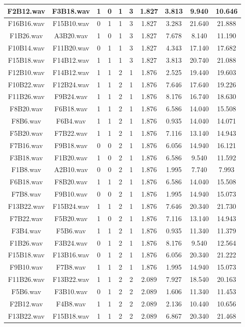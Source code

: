 \documentclass[11pt,a4paper]{book}
\begin{document}
\begin{longtable}[c]{|c|c|c|c|c|c|c|c|c|c|}
F2B12.wav&F3B18.wav&1&0&1&3&1.827&3.813&9.940&10.646\\ \hline
F16B16.wav&F15B10.wav&0&1&1&3&1.827&3.283&21.640&21.888\\ \hline
F1B26.wav&A3B20.wav&1&0&1&3&1.827&7.678&8.140&11.190\\ \hline
F10B14.wav&F11B20.wav&0&1&1&3&1.827&4.343&17.140&17.682\\ \hline
F15B18.wav&F14B12.wav&1&1&1&3&1.827&3.813&20.740&21.088\\ \hline
F12B10.wav&F14B12.wav&1&1&2&1&1.876&2.525&19.440&19.603\\ \hline
F10B22.wav&F12B24.wav&1&1&2&1&1.876&7.646&17.640&19.226\\ \hline
F11B26.wav&F9B24.wav&1&1&2&1&1.876&8.176&16.740&18.630\\ \hline
F8B20.wav&F6B18.wav&1&1&2&1&1.876&6.586&14.040&15.508\\ \hline
F8B6.wav&F6B4.wav&1&1&2&1&1.876&0.935&14.040&14.071\\ \hline
F5B20.wav&F7B22.wav&1&1&2&1&1.876&7.116&13.140&14.943\\ \hline
F7B16.wav&F9B18.wav&0&0&2&1&1.876&6.056&14.940&16.121\\ \hline
F3B18.wav&F1B20.wav&1&0&2&1&1.876&6.586&9.540&11.592\\ \hline
F1B8.wav&A2B10.wav&0&0&2&1&1.876&1.995&7.740&7.993\\ \hline
F6B18.wav&F8B20.wav&1&1&2&1&1.876&6.586&14.040&15.508\\ \hline
F7B8.wav&F9B10.wav&0&0&2&1&1.876&1.995&14.940&15.073\\ \hline
F13B22.wav&F15B24.wav&1&1&2&1&1.876&7.646&20.340&21.730\\ \hline
F7B22.wav&F5B20.wav&1&0&2&1&1.876&7.116&13.140&14.943\\ \hline
F3B4.wav&F5B6.wav&1&1&2&1&1.876&0.935&11.340&11.379\\ \hline
F1B26.wav&F3B24.wav&0&1&2&1&1.876&8.176&9.540&12.564\\ \hline
F15B18.wav&F13B16.wav&0&1&2&1&1.876&6.056&20.340&21.222\\ \hline
F9B10.wav&F7B8.wav&1&1&2&1&1.876&1.995&14.940&15.073\\ \hline
F11B26.wav&F13B22.wav&1&1&2&2&2.089&7.927&18.540&20.163\\ \hline
F5B6.wav&F3B10.wav&0&1&2&2&2.089&1.606&11.340&11.453\\ \hline
F2B12.wav&F4B8.wav&1&1&2&2&2.089&2.136&10.440&10.656\\ \hline
F13B22.wav&F15B18.wav&1&1&2&2&2.089&6.867&20.340&21.468\\ \hline

\end{longtable}
\end{document}
